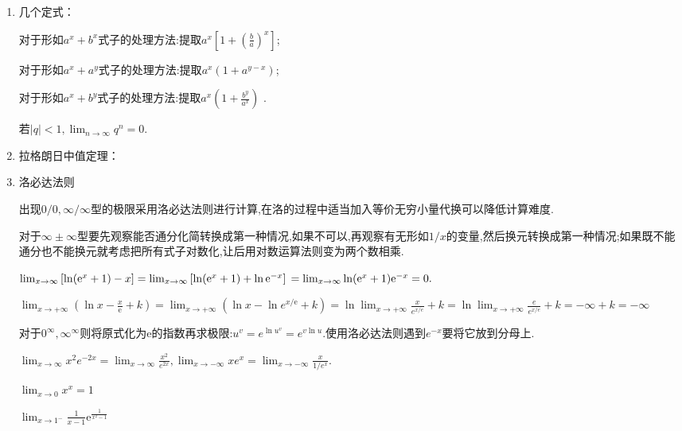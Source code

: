 \begin{enumerate}
\item 几个定式：

对于形如$a^x+b^x$式子的处理方法:提取$a^x\left[1+\left(\frac{b}{a}\right) ^x\right] $;

对于形如$a^x+a^y$式子的处理方法:提取$a^x \left(1+a^{y-x} \right)$;

对于形如$a^x+b^y$式子的处理方法:提取$a^x \left(1+\frac{b^y}{a^x} \right)$ .

若$\left\lvert q\right\rvert <1,\lim_{n \to \infty}q^n=0$.

\item 拉格朗日中值定理：


\item 洛必达法则

出现$0/0,\infty/\infty$型的极限采用洛必达法则进行计算,在洛的过程中适当加入等价无穷小量代换可以降低计算难度.

对于$\infty\pm\infty$型要先观察能否通分化简转换成第一种情况,如果不可以,再观察有无形如$1/x$的变量,然后换元转换成第一种情况;如果既不能通分也不能换元就考虑把所有式子对数化,让后用对数运算法则变为两个数相乘.
\begin{examp}
    {$\lim_{x \to \infty}\left[\ln (\mathrm{e}^x+1)-x \right] = \lim_{x \to \infty}\left[\ln (\mathrm{e}^x+1)+\ln \mathrm{e}^{-x} \right] \\= \lim_{x \to \infty}\ln (\mathrm{e}^x+1)\mathrm{e}^{-x}=0.$}
\end{examp}
\begin{examp}
    {$\lim_{x \to +\infty}(\ln x-\frac{x}{\mathrm{e}}+k)=\lim_{x \to +\infty}(\ln x-\ln e^{x/\mathrm{e}}+k)=\ln \lim_{x \to +\infty}\frac{x}{e^{x/e}}+k=\ln \lim_{x \to +\infty}\frac{e}{e^{x/e}}+k=-\infty+k=-\infty$}
\end{examp}

对于$0^\infty,\infty^\infty$则将原式化为$\mathrm{e}$的指数再求极限:$u^v=e^{\ln u^v}=e^{v\ln u}.$使用洛必达法则遇到$e^{-x}$要将它放到分母上.
\begin{examp}
    {$\lim_{x \to \infty}x^2e^{-2x}=\lim_{x \to \infty}\frac{x^2}{e^{2x}},\lim_{x \to -\infty}xe^x=\lim_{x \to -\infty}\frac{x}{1/e^x}$.}
\end{examp}

\begin{examp}
    {$\lim_{x \to 0} x^x=1$}
\end{examp}

\begin{examp}{$\lim_{x \to 1^{-}} \frac{1}{x-1}\mathrm{e} ^{\frac{1}{x^2-1}}$}


\end{examp}
\end{enumerate}
